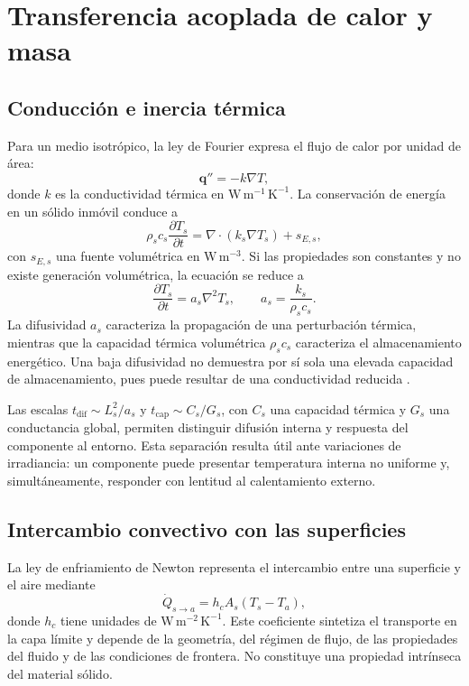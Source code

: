 \section{Transferencia acoplada de calor y masa}
\label{sec:transferencia_calor_masa}

\subsection{Conducción e inercia térmica}

Para un medio isotrópico, la ley de Fourier expresa el flujo de calor por unidad de área:
\begin{equation}
\mathbf q''=-k\nabla T,
\label{eq:fourier}
\end{equation}
donde $k$ es la conductividad térmica en $\mathrm{W\,m^{-1}\,K^{-1}}$. La conservación de energía en un sólido inmóvil conduce a
\begin{equation}
\rho_s c_s\frac{\partial T_s}{\partial t}
=\nabla\cdot(k_s\nabla T_s)+s_{E,s},
\label{eq:heatdiffusion}
\end{equation}
con $s_{E,s}$ una fuente volumétrica en $\mathrm{W\,m^{-3}}$. Si las propiedades son constantes y no existe generación volumétrica, la ecuación se reduce a
\begin{equation}
\frac{\partial T_s}{\partial t}=a_s\nabla^2T_s,
\qquad
a_s=\frac{k_s}{\rho_sc_s}.
\label{eqn:transferenciacalor}
\end{equation}
La difusividad $a_s$ caracteriza la propagación de una perturbación térmica, mientras que la capacidad térmica volumétrica $\rho_sc_s$ caracteriza el almacenamiento energético. Una baja difusividad no demuestra por sí sola una elevada capacidad de almacenamiento, pues puede resultar de una conductividad reducida \cite{bergman2017}.

Las escalas $t_{\mathrm{dif}}\sim L_s^2/a_s$ y $t_{\mathrm{cap}}\sim C_s/G_s$, con $C_s$ una capacidad térmica y $G_s$ una conductancia global, permiten distinguir difusión interna y respuesta del componente al entorno. Esta separación resulta útil ante variaciones de irradiancia: un componente puede presentar temperatura interna no uniforme y, simultáneamente, responder con lentitud al calentamiento externo.

\subsection{Intercambio convectivo con las superficies}

La ley de enfriamiento de Newton representa el intercambio entre una superficie y el aire mediante
\begin{equation}
\dot Q_{s\rightarrow a}=h_c A_s(T_s-T_a),
\label{eq:newton}
\end{equation}
donde $h_c$ tiene unidades de $\mathrm{W\,m^{-2}\,K^{-1}}$. Este coeficiente sintetiza el transporte en la capa límite y depende de la geometría, del régimen de flujo, de las propiedades del fluido y de las condiciones de frontera. No constituye una propiedad intrínseca del material sólido.

